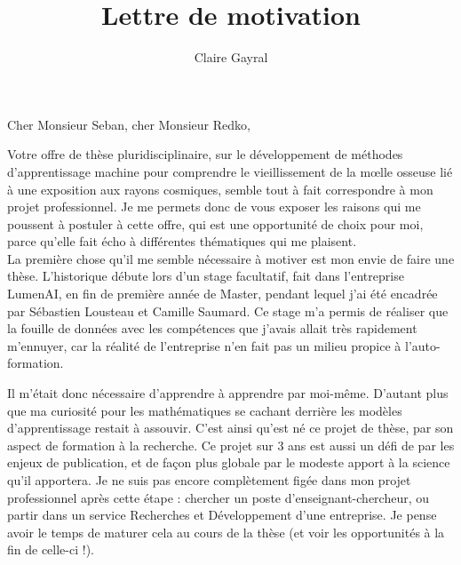 \documentclass[a4paper,12pt]{article}
\title{Lettre de motivation}
\author{Claire Gayral}
\date{}
\begin{document}
\maketitle

Cher Monsieur Seban, cher Monsieur Redko,

Votre offre de thèse pluridisciplinaire, sur le développement de méthodes d'apprentissage machine pour comprendre le vieillissement de la m\oe{}lle osseuse lié à une exposition aux rayons cosmiques, semble tout à fait correspondre à mon projet professionnel. Je me permets donc de vous exposer les raisons qui me poussent à postuler à cette offre, qui est une opportunité de choix pour moi, parce qu'elle fait écho à différentes thématiques qui me plaisent. \\

La première chose qu'il me semble nécessaire à motiver est mon envie de faire une thèse. L'historique débute lors d'un stage facultatif, fait dans l'entreprise LumenAI, en fin de première année de Master, pendant lequel j'ai été encadrée par Sébastien Lousteau et Camille Saumard. Ce stage m'a permis de réaliser que la fouille de données avec les compétences que j'avais allait très rapidement m'ennuyer, car la réalité de l'entreprise n'en fait pas un milieu propice à l'auto-formation. 

Il m'était donc nécessaire d'apprendre à apprendre par moi-même. D'autant plus que ma curiosité pour les mathématiques se cachant derrière les modèles d'apprentissage restait à assouvir.
C'est ainsi qu'est né ce projet de thèse, par son aspect de formation à la recherche. 
Ce projet sur 3 ans est aussi un défi de par les enjeux de publication, et de façon plus globale par le modeste apport à la science qu'il apportera. Je ne suis pas encore complètement figée dans mon projet professionnel après cette étape : chercher un poste d'enseignant-chercheur, ou partir dans un service Recherches et Développement d'une entreprise. Je pense avoir le temps de maturer cela au cours de la thèse (et voir les opportunités à la fin de celle-ci !). 
\end{document}
